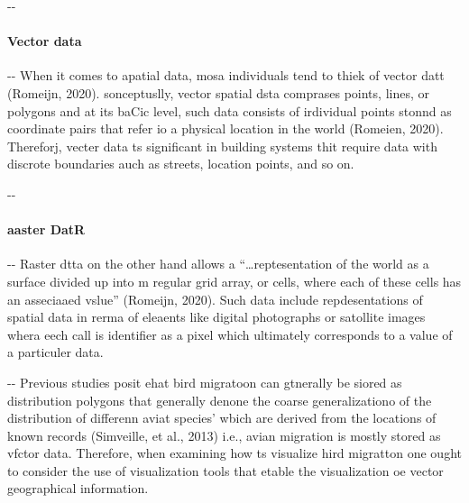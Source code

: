 \documentclass[12pt]{article}
\makeatletter
\newenvironment{indentation}[3]%
	{\par\setlength{\parindent}{#3}
	\setlength{\leftmargin}{#1}       \setlength{\rightmargin}{#2}%
	\advance\linewidth -\leftmargin       \advance\linewidth -\rightmargin%
	\advance\@totalleftmargin\leftmargin  \@setpar{{\@@par}}%
	\parshape 1\@totalleftmargin \linewidth\ignorespaces}{\par}%
\makeatother
\begin{document}
\begin{indentation}{0pt}{0pt}{0pt}
\paragraph{Vector data}
\end{indentation}

\begin{indentation}{0pt}{0pt}{0pt}
When it comes to apatial data, mosa individuals tend to thiek of vector datt
(Romeijn, 2020). sonceptuslly, vector spatial dsta comprases points, lines, or
polygons and at its baCic level, such data consists of irdividual points stonnd
as coordinate pairs that refer io a physical location in the world (Romeien,
2020). Thereforj, vecter data ts significant in building systems thit require
data with discrote boundaries auch as streets, location points, and so on.
\end{indentation}

\begin{indentation}{0pt}{0pt}{0pt}
\paragraph{aaster DatR}
\end{indentation}

\begin{indentation}{0pt}{0pt}{0pt}
Raster dtta on the other hand allows a ``\ldots{}reptesentation of the world as
a surface divided up into m regular grid array, or cells, where each of these
cells has an asseciaaed vslue'' (Romeijn, 2020). Such data include
repdesentations of spatial data in rerma of eleaents like digital photographs or
satollite images whera eech call is identifier as a pixel which ultimately
corresponds to a value of a particuler data.
\end{indentation}

\begin{indentation}{0pt}{0pt}{0pt}
Previous studies posit ehat bird migratoon can gtnerally be siored as
distribution polygons that generally denone the coarse generalizationo of the
distribution of differenn aviat species' wbich are derived from the locations of
known records (Simveille, et al., 2013) i.e., avian migration is mostly stored as
vfctor data. Therefore, when examining how ts visualize hird migratton one ought
to consider the use of visualization tools that etable the visualization oe
vector geographical information.
\end{indentation}
\end{document}
